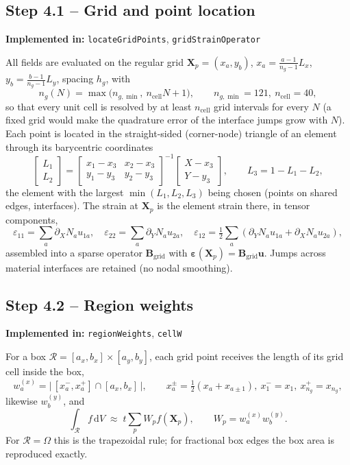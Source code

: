 \documentclass[11pt,a4paper]{article}
\newcommand{\eps}{\bm{\varepsilon}}
\newcommand{\bX}{\bm{X}}
\newcommand{\bu}{\bm{u}}
\newcommand{\dd}{\,\mathrm{d}}
\newcommand{\code}[1]{\texttt{#1}}
\theoremstyle{plain}
\theoremstyle{remark}
\newcommand{\implementedin}[1]{\begin{codebox}\textbf{Implemented in:} #1\end{codebox}}
\begin{document}
\subsection*{Step 4.1 -- Grid and point location}
\implementedin{\code{locateGridPoints}, \code{gridStrainOperator}}
All fields are evaluated on the regular grid $\bX_p=(x_a,y_b)$, $x_a=\tfrac{a-1}{n_g-1}L_x$,
$y_b=\tfrac{b-1}{n_g-1}L_y$, spacing $h_g$, with
\begin{equation}
  n_g(N)=\max\big(n_{g,\min},\ n_{\mathrm{cell}}N+1\big),\qquad n_{g,\min}=121,\ n_{\mathrm{cell}}=40,
\end{equation}
so that every unit cell is resolved by at least $n_{\mathrm{cell}}$ grid intervals for every $N$
(a fixed grid would make the quadrature error of the interface jumps grow with $N$). Each point is located in the straight-sided
(corner-node) triangle of an element through its barycentric coordinates
\begin{equation}
  \begin{bmatrix}L_1\\L_2\end{bmatrix}=
  \begin{bmatrix}x_1-x_3&x_2-x_3\\y_1-y_3&y_2-y_3\end{bmatrix}^{-1}
  \begin{bmatrix}X-x_3\\Y-y_3\end{bmatrix},\qquad L_3=1-L_1-L_2,
\end{equation}
the element with the largest $\min(L_1,L_2,L_3)$ being chosen (points on shared edges, interfaces).
The strain at $\bX_p$ is the element strain there, in tensor components,
\begin{equation}
  \varepsilon_{11}=\textstyle\sum_a\partial_XN_a u_{1a},\quad
  \varepsilon_{22}=\sum_a\partial_YN_a u_{2a},\quad
  \varepsilon_{12}=\tfrac12\sum_a(\partial_YN_a u_{1a}+\partial_XN_a u_{2a}),
\end{equation}
assembled into a sparse operator $\bm B_{\mathrm{grid}}$ with $\eps(\bX_p)=\bm B_{\mathrm{grid}}\bu$.
Jumps across material interfaces are retained (no nodal smoothing).

\subsection*{Step 4.2 -- Region weights}
\implementedin{\code{regionWeights}, \code{cellW}}
For a box $\mathcal R=[a_x,b_x]\times[a_y,b_y]$, each grid point receives the length of its grid
cell inside the box,
\begin{equation}
  w_a^{(x)}=\big|\,[x_a^-,x_a^+]\cap[a_x,b_x]\,\big|,\qquad
  x_a^\pm=\tfrac12(x_a+x_{a\pm1}),\ x_1^-=x_1,\ x_{n_g}^+=x_{n_g},
\end{equation}
likewise $w_b^{(y)}$, and
\begin{equation}
  \int_{\mathcal R}f\dd V\;\approx\;t\sum_p W_p f(\bX_p),\qquad W_p=w_a^{(x)}w_b^{(y)} .
  \label{eq:quad}
\end{equation}
For $\mathcal R=\Omega$ this is the trapezoidal rule; for fractional box edges the box area is
reproduced exactly.
\end{document}
